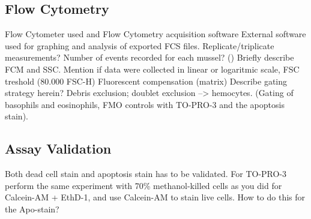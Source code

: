 \subsection{Flow Cytometry}
Flow Cytometer used and Flow Cytometry acquisition software
External software used for graphing and analysis of exported FCS files.
Replicate/triplicate measurements?
Number of events recorded for each mussel? ()
Briefly describe FCM and SSC.
Mention if data were collected in linear or logaritmic scale, 
FSC treshold (80.000 FSC-H)
Fluorescent compensation (matrix)
Describe gating strategy herein? Debris exclusion; doublet exclusion --> hemocytes. (Gating of basophils and eosinophils, FMO controls with TO-PRO-3 and the apoptosis stain).

\begin{table}[H]
	\centering
	\caption{The FCM acquisition and fluidics settings specified with the BD Accuri C6 Plus acquisition software during the flow cytometric experiments reported in this work.}
	\label{tb:FCM_settings}
\end{table}

\subsection{Assay Validation}
Both dead cell stain and apoptosis stain has to be validated. For TO-PRO-3 perform the same experiment with 70\% methanol-killed cells as you did for Calcein-AM + EthD-1, and use Calcein-AM to stain live cells.
How to do this for the Apo-stain?